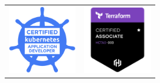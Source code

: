 \documentclass{article}
\begin{document}
\begin{tabular}{ll}
    \href{https://www.credly.com/badges/f496c372-5779-49d9-b51a-58aff3c5963b/public_url}{\includegraphics[width=3cm]{./images/ckad.png}} & 
    \href{https://www.credly.com/badges/d0127be5-b859-4703-9c42-62f73ad796ed/public_url}{\includegraphics[width=3cm]{./images/terraform-associate.png}} & 
\end{tabular}
\end{document}
